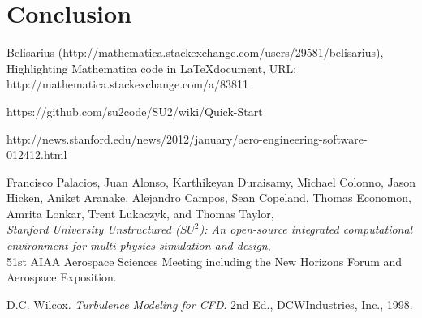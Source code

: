 \documentclass[10pt, titlepage]{article}
\begin{document}
\section{Conclusion}

\lipsum[5-7]

\newpage
\begin{thebibliography}{9}


Belisarius (http://mathematica.stackexchange.com/users/29581/belisarius), Highlighting Mathematica code in \LaTeX document, URL: http://mathematica.stackexchange.com/a/83811

https://github.com/su2code/SU2/wiki/Quick-Start

http://news.stanford.edu/news/2012/january/aero-engineering-software-012412.html

Francisco Palacios, Juan Alonso, Karthikeyan Duraisamy, Michael Colonno, Jason Hicken, Aniket Aranake, Alejandro Campos, Sean Copeland, Thomas Economon, Amrita Lonkar, Trent Lukaczyk, and Thomas Taylor, \\
\emph{Stanford University Unstructured ($SU^2$): An open-source integrated computational environment for multi-physics simulation and design}, \\
51st AIAA Aerospace Sciences Meeting including the New Horizons Forum and Aerospace Exposition. 

D.C. Wilcox. \emph{Turbulence Modeling for CFD}. 2nd Ed., DCWIndustries, Inc., 1998.

\end{thebibliography}
\end{document}
